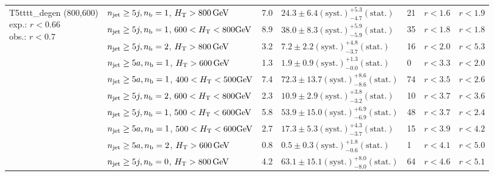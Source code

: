 \begin{table}[h!]
\begin{tabular}{ lllllll }
\multirow{10}{*}{\parbox[t]{2cm}{T5tttt\_degen (800,600)\\exp.: $r<0.66$\\obs.: $r<0.7$}}
 & $n_{\mathrm{jet}} \geq5j,n_{\text{b}} =1$, $\mbox{$H_\text{T}$} > 800 \, \mathrm{GeV}$ & 7.0 & $24.3 \pm 6.4 \mathrm{(syst.)} ^{+5.3}_{-4.7} \mathrm{(stat.)}$ & 21 & $r < 1.6$ & $r < 1.9$\\ 
 & $n_{\mathrm{jet}} \geq5j,n_{\text{b}} =1$, $600 < \mbox{$H_\text{T}$} < 800 \mathrm{GeV}$ & 8.9 & $38.0 \pm 8.3 \mathrm{(syst.)} ^{+5.9}_{-5.9} \mathrm{(stat.)}$ & 35 & $r < 1.8$ & $r < 1.8$\\ 
 & $n_{\mathrm{jet}} \geq5j,n_{\text{b}} =2$, $\mbox{$H_\text{T}$} > 800 \, \mathrm{GeV}$ & 3.2 & $7.2 \pm 2.2 \mathrm{(syst.)} ^{+4.8}_{-3.7} \mathrm{(stat.)}$ & 16 & $r < 2.0$ & $r < 5.3$\\ 
 & $n_{\mathrm{jet}} \geq5a,n_{\text{b}} =1$, $\mbox{$H_\text{T}$} > 600 \, \mathrm{GeV}$ & 1.3 & $1.9 \pm 0.9 \mathrm{(syst.)} ^{+1.3}_{-0.0} \mathrm{(stat.)}$ & 0 & $r < 3.3$ & $r < 2.0$\\ 
 & $n_{\mathrm{jet}} \geq5a,n_{\text{b}} =1$, $400 < \mbox{$H_\text{T}$} < 500 \mathrm{GeV}$ & 7.4 & $72.3 \pm 13.7 \mathrm{(syst.)} ^{+8.6}_{-8.6} \mathrm{(stat.)}$ & 74 & $r < 3.5$ & $r < 2.6$\\ 
 & $n_{\mathrm{jet}} \geq5j,n_{\text{b}} =2$, $600 < \mbox{$H_\text{T}$} < 800 \mathrm{GeV}$ & 2.3 & $10.9 \pm 2.9 \mathrm{(syst.)} ^{+3.8}_{-3.2} \mathrm{(stat.)}$ & 10 & $r < 3.7$ & $r < 3.6$\\ 
 & $n_{\mathrm{jet}} \geq5j,n_{\text{b}} =1$, $500 < \mbox{$H_\text{T}$} < 600 \mathrm{GeV}$ & 5.8 & $53.9 \pm 15.0 \mathrm{(syst.)} ^{+6.9}_{-6.9} \mathrm{(stat.)}$ & 48 & $r < 3.7$ & $r < 2.4$\\ 
 & $n_{\mathrm{jet}} \geq5a,n_{\text{b}} =1$, $500 < \mbox{$H_\text{T}$} < 600 \mathrm{GeV}$ & 2.7 & $17.3 \pm 5.3 \mathrm{(syst.)} ^{+4.3}_{-3.7} \mathrm{(stat.)}$ & 15 & $r < 3.9$ & $r < 4.2$\\ 
 & $n_{\mathrm{jet}} \geq5a,n_{\text{b}} =2$, $\mbox{$H_\text{T}$} > 600 \, \mathrm{GeV}$ & 0.8 & $0.5 \pm 0.3 \mathrm{(syst.)} ^{+1.8}_{-0.6} \mathrm{(stat.)}$ & 1 & $r < 4.1$ & $r < 5.0$\\ 
 & $n_{\mathrm{jet}} \geq5j,n_{\text{b}} =0$, $\mbox{$H_\text{T}$} > 800 \, \mathrm{GeV}$ & 4.2 & $63.1 \pm 15.1 \mathrm{(syst.)} ^{+8.0}_{-8.0} \mathrm{(stat.)}$ & 64 & $r < 4.6$ & $r < 5.1$\\ \hline
    \hline
  \end{tabular}
\end{table}

